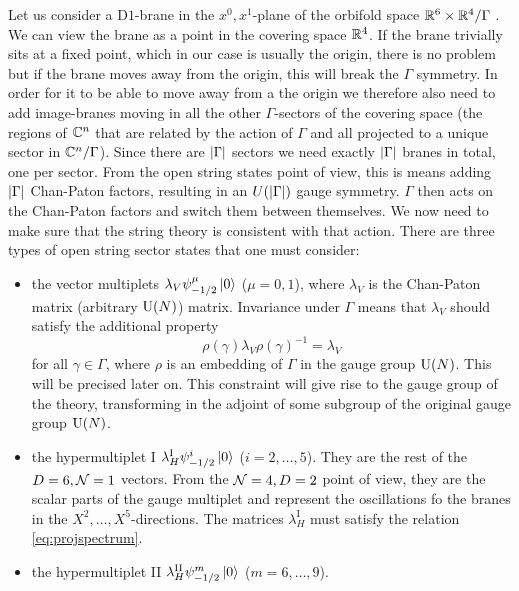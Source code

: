         Let us consider a D$1$-brane in the $x^0,x^1$-plane of the orbifold space $\mathbb{R}^6\times\mathbb{R}^4/\Gamma$ \cite{johnson_1997,johnson_2002}. We can view the brane as a point in the covering space $\mathbb{R}^4$. If the brane trivially sits at a fixed point, which in our case is usually the origin, there is no problem but if the brane moves away from the origin, this will break the $\Gamma$ symmetry. In order for it to be able to move away from a the origin we therefore also need to add image-branes moving in all the other $\Gamma$-sectors of the covering space (the regions of $\mathbb{C}^n$ that are related by the action of $\Gamma$ and all projected to a unique sector in $\mathbb{C}^n/\Gamma$). Since there are $\abs{\Gamma}$ sectors we need exactly $\abs{\Gamma}$ branes in total, one per sector. From the open string states point of view, this is means adding $\abs{\Gamma}$ Chan-Paton factors, resulting in an $U(\abs{\Gamma})$ gauge symmetry. $\Gamma$ then acts on the Chan-Paton factors and switch them between themselves. We now need to make sure that the string theory is consistent with that action. There are three types of open string sector states that one must consider:
        \begin{itemize}
            \item the vector multiplets $\lambda_V\psi^\mu_{-1/2}\ket{0}$ ($\mu=0,1$), where $\lambda_V$ is the Chan-Paton matrix (arbitrary $\text{U}(N)$) matrix. Invariance under $\Gamma$ means that $\lambda_V$ should satisfy the additional property
            \begin{equation}
                \rho(\gamma)\lambda_V\rho(\gamma)^{-1}=\lambda_V\label{eq:projspectrum}
            \end{equation}
            for all $\gamma\in\Gamma$, where $\rho$ is an embedding of $\Gamma$ in the gauge group $\text{U}(N)$. This will be precised later on. This constraint will give rise to the gauge group of the theory, transforming in the adjoint of some subgroup of the original gauge group $\text{U}(N)$.
            \item the hypermultiplet I $\lambda^{\text{I}}_H\psi^i_{-1/2}\ket{0}$ ($i=2,\dots,5$). They are the rest of the $D=6,\mathcal{N}=1$ vectors. From the $\mathcal{N}=4,D=2$ point of view, they are the scalar parts of the gauge multiplet and represent the oscillations fo the branes in the $X^2,\dots,X^5$-directions. The matrices $\lambda^{\text{I}}_H$ must satisfy the relation \eqref{eq:projspectrum}.
            \item the hypermultiplet II $\lambda^{\text{II}}_H\psi^m_{-1/2}\ket{0}$ ($m=6,\dots,9$).
        \end{itemize}
